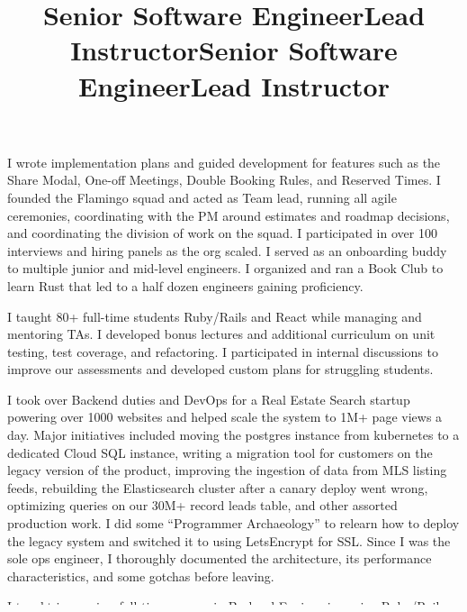 \documentclass[margintitle,line]{res}
\begin{document}
\begin{resume}
\title{Senior Software Engineer}
\begin{position}
  I wrote implementation plans and guided development for features such as the Share Modal, One-off Meetings, Double Booking Rules, and Reserved Times.
  I founded the Flamingo squad and acted as Team lead, running all agile ceremonies, coordinating with the PM around estimates and roadmap decisions, and coordinating the division of work on the squad.
  I participated in over 100 interviews and hiring panels as the org scaled.
  I served as an onboarding buddy to multiple junior and mid-level engineers.
  I organized and ran a Book Club to learn Rust that led to a half dozen engineers gaining proficiency.
\end{position}

\title{Lead Instructor}
\begin{position}
  I taught 80+ full-time students Ruby/Rails and React while managing and mentoring TAs.
  I developed bonus lectures and additional curriculum on unit testing, test coverage, and
  refactoring. I participated in internal discussions to improve our assessments and
  developed custom plans for struggling students.
\end{position}

\title{Senior Software Engineer}
\begin{position}
  I took over Backend duties and DevOps for a Real Estate Search startup powering over 1000
  websites and helped scale the system to 1M+ page views a day. Major initiatives included moving
  the postgres instance from kubernetes to a dedicated Cloud SQL instance, writing a migration
  tool for customers on the legacy version of the product, improving the ingestion of data from
  MLS listing feeds, rebuilding the Elasticsearch cluster after a canary deploy went wrong,
  optimizing queries on our 30M+ record leads table, and other assorted production work.
  I did some ``Programmer Archaeology'' to relearn how to deploy the legacy system
  and switched it to using LetsEncrypt for SSL. Since I was the sole ops engineer, I thoroughly
  documented the architecture, its performance characteristics, and some gotchas before leaving.
\end{position}

\title{Lead Instructor}
\begin{position}
  I taught immersive, full-time courses in Backend Engineering using Ruby/Rails and Frontend Engineering using Javascript/Angular.
  I was promoted to Lead Instructor after 6 months. As an instructor, I iterated
  on curriculum, lectured, graded assignments, and worked 1-on-1 with students
  during lab time. As a lead, I mentored a dozen new instructors at different
  campuses and served as a resource for classroom issues, struggling students,
  and other problems.
\end{position}


\end{resume}
\end{document}
